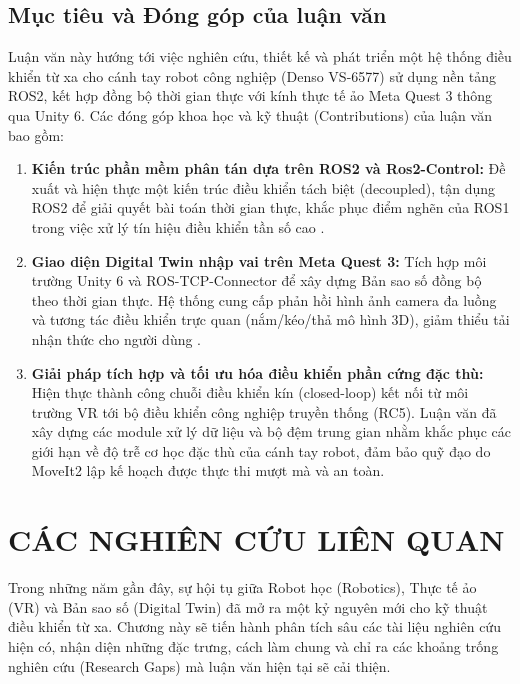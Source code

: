 \section{Mục tiêu và Đóng góp của luận văn}
\label{sec:contributions_outline}
Luận văn này hướng tới việc nghiên cứu, thiết kế và phát triển một hệ thống điều khiển từ xa cho cánh tay robot công nghiệp (Denso VS-6577) sử dụng nền tảng ROS2, kết hợp đồng bộ thời gian thực với kính thực tế ảo Meta Quest 3 thông qua Unity 6. Các đóng góp khoa học và kỹ thuật (Contributions) của luận văn bao gồm:
\begin{enumerate}
    \item \textbf{Kiến trúc phần mềm phân tán dựa trên ROS2 và Ros2-Control:} Đề xuất và hiện thực một kiến trúc điều khiển tách biệt (decoupled), tận dụng ROS2 để giải quyết bài toán thời gian thực, khắc phục điểm nghẽn của ROS1 trong việc xử lý tín hiệu điều khiển tần số cao \cite{kawshan2026digital}.
    \item \textbf{Giao diện Digital Twin nhập vai trên Meta Quest 3:} Tích hợp môi trường Unity 6 và ROS-TCP-Connector để xây dựng Bản sao số đồng bộ theo thời gian thực. Hệ thống cung cấp phản hồi hình ảnh camera đa luồng và tương tác điều khiển trực quan (nắm/kéo/thả mô hình 3D), giảm thiểu tải nhận thức cho người dùng \cite{zhang2023research}.
    \item \textbf{Giải pháp tích hợp và tối ưu hóa điều khiển phần cứng đặc thù:} Hiện thực thành công chuỗi điều khiển kín (closed-loop) kết nối từ môi trường VR tới bộ điều khiển công nghiệp truyền thống (RC5). Luận văn đã xây dựng các module xử lý dữ liệu và bộ đệm trung gian nhằm khắc phục các giới hạn về độ trễ cơ học đặc thù của cánh tay robot, đảm bảo quỹ đạo do MoveIt2 lập kế hoạch được thực thi mượt mà và an toàn.
\end{enumerate}


\chapter{CÁC NGHIÊN CỨU LIÊN QUAN}
\label{chap:related_works}
Trong những năm gần đây, sự hội tụ giữa Robot học (Robotics), Thực tế ảo (VR) và Bản sao số (Digital Twin) đã mở ra một kỷ nguyên mới cho kỹ thuật điều khiển từ xa. Chương này sẽ tiến hành phân tích sâu các tài liệu nghiên cứu hiện có, nhận diện những đặc trưng, cách làm chung và chỉ ra các khoảng trống nghiên cứu (Research Gaps) mà luận văn hiện tại sẽ cải thiện.

